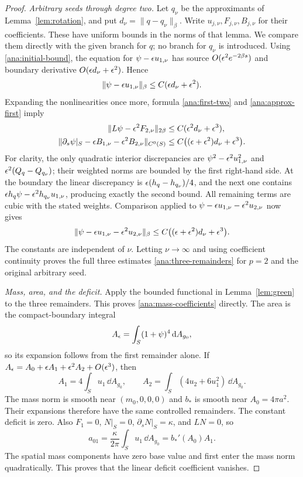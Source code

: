 \begin{proof}
\emph{Arbitrary seeds through degree two.}
Let $q_\nu$ be the approximants of Lemma~\ref{lem:rotation}, and
put $d_\nu=\|q-q_\nu\|_\beta$.  Write $u_{j,\nu},F_{j,\nu},B_{j,\nu}$
for their coefficients.  These have uniform bounds in the norms of
that lemma.  We compare them directly with the given branch for $q$;
no branch for $q_\nu$ is introduced.
Using \eqref{ana:initial-bound}, the equation for
$\psi-\epsilon u_{1,\nu}$ has source
$O(\epsilon^2e^{-2\beta s})$ and boundary derivative
$O(\epsilon d_\nu+\epsilon^2)$.  Hence
\begin{equation}
 \|\psi-\epsilon u_{1,\nu}\|_\beta
       \leq C(\epsilon d_\nu+\epsilon^2).
 \label{ana:approx-first}
\end{equation}
Expanding the nonlinearities once more, formula
\eqref{ana:first-two} and \eqref{ana:approx-first} imply
\begin{align}
 \|L\psi-\epsilon^2F_{2,\nu}\|_{2\beta}
   &\leq C(\epsilon^2d_\nu+\epsilon^3),\notag\\
 \|\partial_s\psi|_S-\epsilon B_{1,\nu}-\epsilon^2B_{2,\nu}\|_{C^0(S)}
   &\leq C\bigl((\epsilon+\epsilon^2)d_\nu+\epsilon^3\bigr).
 \label{ana:approx-sources}
\end{align}
For clarity, the only quadratic interior discrepancies are
$\psi^2-\epsilon^2u_{1,\nu}^2$ and
$\epsilon^2(Q_q-Q_{q_\nu})$; their weighted norms are bounded by the
first right-hand side.  At the boundary the linear discrepancy is
$\epsilon(h_q-h_{q_\nu})/4$, and the next one contains
$\epsilon h_q\psi-\epsilon^2h_{q_\nu}u_{1,\nu}$, producing exactly the
second bound.  All remaining terms are cubic with the stated weights.
Comparison applied to
$\psi-\epsilon u_{1,\nu}-\epsilon^2u_{2,\nu}$ now gives
\[
 \|\psi-\epsilon u_{1,\nu}-\epsilon^2u_{2,\nu}\|_\beta
 \leq C\bigl((\epsilon+\epsilon^2)d_\nu+\epsilon^3\bigr).
\]
The constants are independent of $\nu$.  Letting $\nu\to\infty$
and using coefficient continuity proves the full three estimates
\eqref{ana:three-remainders} for $p=2$ and the original arbitrary seed.

\emph{Mass, area, and the deficit.}
Apply the bounded functional in Lemma~\ref{lem:green} to the three
remainders.  This proves \eqref{ana:mass-coefficients} directly.
The area is the compact-boundary integral
\[
 A_\epsilon=\int_S(1+\psi)^4\,\mathrm{d} A_{g_0},
\]
so its expansion follows from the first remainder alone.  If
$A_\epsilon=A_0+\epsilon A_1+\epsilon^2 A_2+O(\epsilon^3)$, then
\[
 A_1=4\int_Su_1\,\dd A_{g_0},\qquad
 A_2=\int_S(4u_2+6u_1^2)\,\dd A_{g_0}.
\]
The mass norm is smooth near $(m_0,0,0,0)$ and $b_*$ is smooth near
$A_0=4\pi a^2$.  Their expansions therefore have the same controlled
remainders.  The constant deficit is zero.  Also $F_1=0$,
$N|_S=0$, $\partial_sN|_S=\kappa$, and $LN=0$, so
\[
 a_{01}=\frac\kappa{2\pi}\int_Su_1\,\dd A_{g_0}
        =b_*'(A_0)A_1.
\]
The spatial mass components have zero base value and first enter
the mass norm quadratically.  This proves that the linear deficit
coefficient vanishes.


\end{proof}

